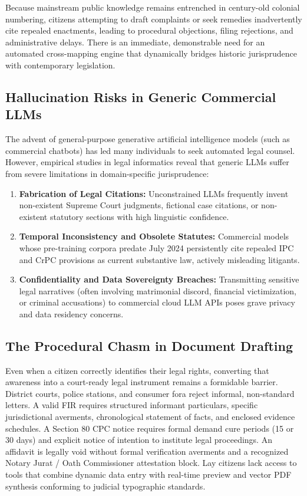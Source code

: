 Because mainstream public knowledge remains entrenched in century-old colonial numbering, citizens attempting to draft complaints or seek remedies inadvertently cite repealed enactments, leading to procedural objections, filing rejections, and administrative delays. There is an immediate, demonstrable need for an automated cross-mapping engine that dynamically bridges historic jurisprudence with contemporary legislation.

\subsection{Hallucination Risks in Generic Commercial LLMs}
The advent of general-purpose generative artificial intelligence models (such as commercial chatbots) has led many individuals to seek automated legal counsel. However, empirical studies in legal informatics reveal that generic LLMs suffer from severe limitations in domain-specific jurisprudence:
\begin{enumerate}
    \item \textbf{Fabrication of Legal Citations:} Unconstrained LLMs frequently invent non-existent Supreme Court judgments, fictional case citations, or non-existent statutory sections with high linguistic confidence.
    \item \textbf{Temporal Inconsistency and Obsolete Statutes:} Commercial models whose pre-training corpora predate July 2024 persistently cite repealed IPC and CrPC provisions as current substantive law, actively misleading litigants.
    \item \textbf{Confidentiality and Data Sovereignty Breaches:} Transmitting sensitive legal narratives (often involving matrimonial discord, financial victimization, or criminal accusations) to commercial cloud LLM APIs poses grave privacy and data residency concerns.
\end{enumerate}

\subsection{The Procedural Chasm in Document Drafting}
Even when a citizen correctly identifies their legal rights, converting that awareness into a court-ready legal instrument remains a formidable barrier. District courts, police stations, and consumer fora reject informal, non-standard letters. A valid FIR requires structured informant particulars, specific jurisdictional averments, chronological statement of facts, and enclosed evidence schedules. A Section 80 CPC notice requires formal demand cure periods (15 or 30 days) and explicit notice of intention to institute legal proceedings. An affidavit is legally void without formal verification averments and a recognized Notary Jurat / Oath Commissioner attestation block. Lay citizens lack access to tools that combine dynamic data entry with real-time preview and vector PDF synthesis conforming to judicial typographic standards.

